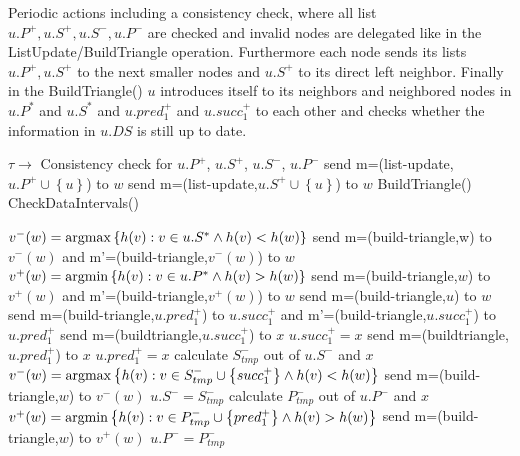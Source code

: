 \documentclass[11pt]{article}
\def\argmin{{\rm argmin}}
\def\argmax{{\rm argmax}}
\begin{document}
\begin{algorithm}[H]
Periodic actions including a consistency check, where all list $u.P^+,u.S^+,u.S^-,u.P^-$ are checked and invalid nodes are delegated like in the ListUpdate/BuildTriangle operation. Furthermore each node sends its lists $u.P^+,u.S^+$ to the  next smaller nodes and $u.S^+$ to its direct left neighbor. Finally in the BuildTriangle() $u$ introduces itself to its neighbors and neighbored nodes in $u.P^*$ and $u.S^*$ and $u.pred^+_1$ and $u.succ^+_1$ to each other and checks whether the information in $u.DS$ is still up to date.

\begin{algorithmic}
\State $\tau \rightarrow$ 
\State Consistency check for $u.P^+$, $u.S^+$, $u.S^-$, $u.P^-$
\State send m=(list-update,$u.P^+\cup\left\{u\right\}$) to $w$
\EndFor
{}
\State send m=(list-update,$u.S^+\cup\left\{u\right\}$) to $w$
\EndFor
\State BuildTriangle()
\State CheckDataIntervals()
\end{algorithmic}
\end{algorithm}



\begin{algorithm}
\begin{algorithmic}

 
\State $v^{-}(w)=\argmax \left\{h(v): v\in u.S^* \wedge h(v)< h(w) \right\}$
\State send m=(build-triangle,w) to $v^{-}(w)$ and  m'=(build-triangle,$v^{-}(w)$) to $w$
\EndFor
{}
\State $v^{+}(w)=\argmin \left\{h(v):v \in u.P^*\wedge h(v)>h(w)\right\}$
\State send m=(build-triangle,$w$) to $v^{+}(w)$ and  m'=(build-triangle,$v^{+}(w)$) to $w$
\EndFor
{}
\State send m=(build-triangle,$u$) to $w$
\EndFor
\State send m=(build-triangle,$u.pred^+_1$) to $u.succ^+_1$ and  m'=(build-triangle,$u.succ^+_1$) to $u.pred^+_1$
\Else {}
\State send m=(buildtriangle,$u.succ^+_1$) to $x$
\State $u.succ^+_1=x$
\State send m=(buildtriangle,$u.pred^+_1$) to $x$
\State $u.pred^+_1=x$
\State calculate $S^-_{tmp}$ out of $u.S^-$ and $x$
\State $v^{-}(w)=\argmax \left\{h(v):v\in S^-_{tmp} \cup \left\{succ^+_1\right\}\wedge h(v)<h(w)\right\}$
\State send m=(build-triangle,$w$) to $v^{-}(w)$
\EndFor
\State $u.S^-=S^-_{tmp}$
\State calculate $P^-_{tmp}$ out of $u.P^-$ and $x$
\State $v^{+}(w)=\argmin \left\{h(v):v\in P^-_{tmp} \cup \left\{pred^+_1\right\}\wedge h(v)>h(w)\right\}$
\State send m=(build-triangle,$w$) to $v^{+}(w)$
\EndFor
\State $u.P^-=P^-_{tmp}$
\EndIf
\EndIf
\EndFunction
\end{algorithmic}
\end{algorithm}
\end{document}
